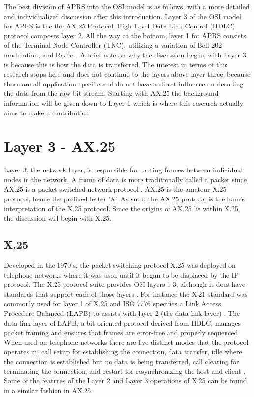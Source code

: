 The best division of APRS into the OSI model is as follows, with a more detailed and individualized discussion after this introduction. Layer 3 of the OSI model for APRS is the the AX.25 Protocol,  High-Level Data Link Control (HDLC) protocol composes layer 2. All the way at the bottom, layer 1 for APRS consists of the Terminal Node Controller (TNC), utilizing a variation of Bell 202 modulation, and Radio \cite{Silver2013}. A brief note on why the discussion begins with Layer 3 is because this is how the data is transferred. The interest in terms of this research stops here and does not continue to the layers above layer three, because those are all application specific and do not have a direct influence on decoding the data from the raw bit stream. Starting with AX.25 the background information will be given down to Layer 1 which is where this research actually aims to make a contribution.

\section{Layer 3 - AX.25}
Layer 3, the network layer, is responsible for routing frames between individual nodes in the network. A frame of data is more traditionally called a packet since AX.25 is a packet switched network protocol \cite{Peterson2011}. AX.25 is the amateur X.25 protocol, hence the prefixed letter 'A'. As such, the AX.25 protocol is the ham's interpretation of the X.25 protocol. Since the origins of AX.25 lie within X.25, the discussion will begin with X.25. 

\subsection{X.25}
Developed in the 1970's, the packet switching protocol X.25 was deployed on telephone networks where it was used until it began to be displaced by the IP protocol. The X.25 protocol suite provides OSI layers 1-3, although it does have standards that support each of those layers \cite{Sosinsky2009}. For instance the X.21 standard was commonly used for layer 1 of X.25 and ISO 7776 specifies a Link Access Procedure Balanced (LAPB) to assists with layer 2 (the data link layer) \cite{Gallagher1997}. The data link layer of LAPB, a bit oriented protocol derived from HDLC,  manages packet framing and ensures that frames are error-free and properly sequenced. When used on telephone networks there are five distinct modes that the protocol operates in: call setup for establishing the connection, data transfer, idle where the connection is established but no data is being transferred, call clearing for terminating the connection, and restart for resynchronizing the host and client \cite{Javvin2006}. Some of the features of the Layer 2 and Layer 3 operations of X.25 can be found in a similar fashion in AX.25.

